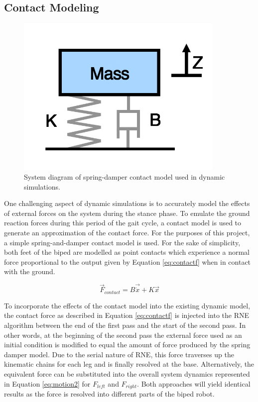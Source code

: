 
\subsection{Contact Modeling} %
\label{sec:contact_modelling}

\begin{figure}[!ht]
	\begin{center}
    \includegraphics[width=100mm]{fig/ch5/springdamper.png}
	\end{center}
  \caption{System diagram of spring-damper contact model used in dynamic simulations.}
\end{figure}

One challenging aspect of dynamic simulations is to accurately model the effects of external forces on the system during the stance phase. To emulate the ground reaction forces during this period of the gait cycle, a contact model is used to generate an approximation of the contact force. For the purposes of this project, a simple spring-and-damper contact model is used. For the sake of simplicity, both feet of the biped are modelled as point contacts which experience a normal force proportional to the output given by Equation \ref{eq:contactf} when in contact with the ground. 

\begin{equation}
	\label{eq:contactf}
	\vec{F}_{contact} = B\vec{\dot{x}} + K\vec{x}
\end{equation}


To incorporate the effects of the contact model into the existing dynamic model, the contact force as described in Equation \ref{eq:contactf} is injected into the RNE algorithm between the end of the first pass and the start of the second pass. In other words, at the beginning of the second pass the external force used as an initial condition is modified to equal the amount of force produced by the spring damper model. Due to the serial nature of RNE, this force traverses up the kinematic chains for each leg and is finally resolved at the base. Alternatively, the equivalent force can be substituted into the overall system dynamics represented in Equation \ref{eq:motion2} for $F_{left}$ and $F_{right}$. Both approaches will yield identical results as the force is resolved into different parts of the biped robot. 

